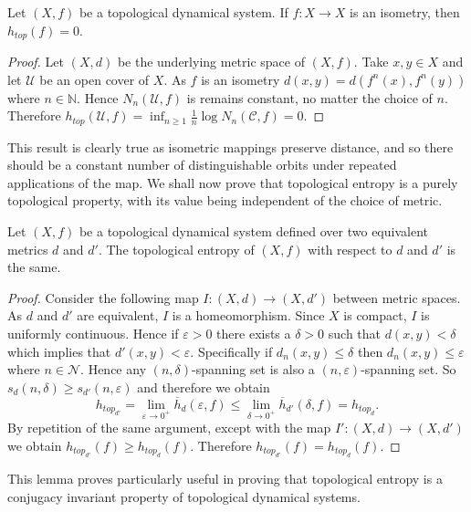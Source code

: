 \begin{prop} \label{prop:isometry-entropy}
    Let $(X, f)$ be a topological dynamical system. If $f: X \to X$ is an isometry, then $h_{top}(f) = 0$.
    \begin{proof}
        Let $(X, d)$ be the underlying metric space of $(X, f)$. Take $x, y \in X$ and let $\mathcal{U}$ be an open cover of $X$. As $f$ is an isometry $d(x, y) = d(f^n(x), f^n(y))$ where $n \in \mathbb{N}$. Hence $N_n(\mathcal{U}, f)$ is remains constant, no matter the choice of $n$. Therefore $h_{top}(\mathcal{U}, f) = \inf_{n \geq 1} \frac{1}{n}\log{N_n(\mathcal{C}, f)} = 0$.
    \end{proof}
\end{prop}

This result is clearly true as isometric mappings preserve distance, and so there should be a constant number of distinguishable orbits under repeated applications of the map. We shall now prove that topological entropy is a purely topological property, with its value being independent of the choice of metric.

\begin{lem} \label{lem:entropy-independent-of-metric}
    Let $(X, f)$ be a topological dynamical system defined over two equivalent metrics $d$ and $d'$. The topological entropy of $(X, f)$ with respect to $d$ and $d'$ is the same.
    \begin{proof}
        Consider the following map  $I: (X, d) \to (X, d')$ between metric spaces. As $d$ and $d'$ are equivalent, $I$ is a homeomorphism. Since $X$ is compact, $I$ is uniformly continuous. Hence if $\varepsilon > 0$ there exists a $\delta > 0$ such that $d(x, y) < \delta$ which implies that $d'(x, y) < \varepsilon$. Specifically if $d_n(x, y) \leq \delta$ then $d_n(x, y) \leq \varepsilon$ where $n \in \mathcal{N}$. Hence any $(n, \delta)$-spanning set is also a $(n, \varepsilon)$-spanning set. So $s_d(n, \delta) \geq s_{d'}(n, \varepsilon)$ and therefore we obtain  \[h_{top_{d'}} = \lim_{\varepsilon \to 0^+}{\overline{h}_d(\varepsilon, f)} \leq \lim_{\delta \to 0^+}{\overline{h}_{d'}(\delta, f)} = h_{top_d}.\] By repetition of the same argument, except with the map $I': (X, d) \to (X, d')$ we obtain $h_{top_{d'}}(f) \geq h_{top_d}(f)$. Therefore $h_{top_{d'}}(f) = h_{top_d}(f)$.
    \end{proof}
\end{lem}

This lemma proves particularly useful in proving that topological entropy is a conjugacy invariant property of topological dynamical systems.

